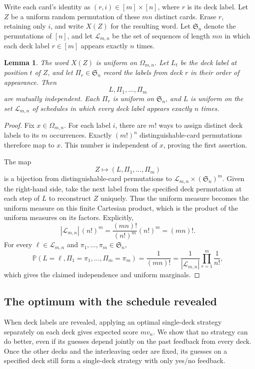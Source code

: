 \documentclass[11pt,reqno]{amsart}
\numberwithin{equation}{section}
\newtheorem{lemma}[theorem]{Lemma}
\theoremstyle{remark}
\theoremstyle{definition}
\begin{document}
Write each card's identity as $(r,i)\in[m]\times[n]$, where $r$ is its deck label. Let $Z$ be a uniform random permutation of these $mn$ distinct cards. Erase $r$, retaining only $i$, and write $X(Z)$ for the resulting word. Let $\mathfrak S_n$ denote the permutations of $[n]$, and let $\mathcal L_{m,n}$ be the set of sequences of length $mn$ in which each deck label $r\in[m]$ appears exactly $n$ times.
\begin{lemma}\label{up:lem:product}
The word $X(Z)$ is uniform on $\Omega_{m,n}$. Let $L_t$ be the deck label at position $t$ of $Z$, and let $\Pi_r\in\mathfrak S_n$ record the labels from deck $r$ in their order of appearance. Then
\[
 L,\Pi_1,\ldots,\Pi_m
\]
are mutually independent. Each $\Pi_r$ is uniform on $\mathfrak S_n$, and $L$ is uniform on the set $\mathcal L_{m,n}$ of schedules in which every deck label appears exactly $n$ times.
\end{lemma}
\begin{proof}
Fix $x\in\Omega_{m,n}$. For each label $i$, there are $m!$ ways to assign distinct deck labels to its $m$ occurrences. Exactly $(m!)^n$ distinguishable-card permutations therefore map to $x$. This number is independent of $x$, proving the first assertion.

The map
\[
 Z\longmapsto (L,\Pi_1,\ldots,\Pi_m)
\]
is a bijection from distinguishable-card permutations to $\mathcal L_{m,n}\times(\mathfrak S_n)^m$. Given the right-hand side, take the next label from the specified deck permutation at each step of $L$ to reconstruct $Z$ uniquely. Thus the uniform measure becomes the uniform measure on this finite Cartesian product, which is the product of the uniform measures on its factors. Explicitly,
\[
 |\mathcal L_{m,n}|\,(n!)^m
 =\frac{(mn)!}{(n!)^m}(n!)^m=(mn)!.
\]
For every $\ell\in\mathcal L_{m,n}$ and $\pi_1,\ldots,\pi_m\in\mathfrak S_n$,
\[
 \mathbb P(L=\ell,\Pi_1=\pi_1,\ldots,\Pi_m=\pi_m)
 =\frac1{(mn)!}=\frac1{|\mathcal L_{m,n}|}\prod_{r=1}^m\frac1{n!},
\]
which gives the claimed independence and uniform marginals.
\end{proof}

\subsection{The optimum with the schedule revealed}\label{sec:enhanced}
When deck labels are revealed, applying an optimal single-deck strategy separately on each deck gives expected score $mv_n$. We show that no strategy can do better, even if its guesses depend jointly on the past feedback from every deck. Once the other decks and the interleaving order are fixed, its guesses on a specified deck still form a single-deck strategy with only yes/no feedback.
\end{document}
